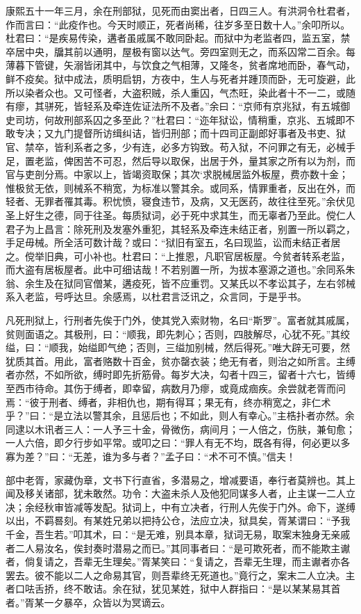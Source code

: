 \documentclass[UTF8,titlepage,oneside]{ctexbook}
\begin{document}
康熙五十一年三月，余在刑部狱，见死而由窦出者，日四三人。有洪洞令杜君者，作而言曰：“此疫作也。今天时顺正，死者尚稀，往岁多至日数十人。”余叩所以。杜君曰：“是疾易传染，遘者虽戚属不敢同卧起。而狱中为老监者四，监五室，禁卒居中央，牖其前以通明，屋极有窗以达气。旁四室则无之，而系囚常二百余。每薄暮下管键，矢溺皆闭其中，与饮食之气相薄，又隆冬，贫者席地而卧，春气动，鲜不疫矣。狱中成法，质明启钥，方夜中，生人与死者并踵顶而卧，无可旋避，此所以染者众也。又可怪者，大盗积贼，杀人重囚，气杰旺，染此者十不一二，或随有瘳，其骈死，皆轻系及牵连佐证法所不及者。”余曰：“京师有京兆狱，有五城御史司坊，何故刑部系囚之多至此？”杜君曰：“迩年狱讼，情稍重，京兆、五城即不敢专决；又九门提督所访缉纠诘，皆归刑部；而十四司正副郎好事者及书吏、狱官、禁卒，皆利系者之多，少有连，必多方钩致。苟入狱，不问罪之有无，必械手足，置老监，俾困苦不可忍，然后导以取保，出居于外，量其家之所有以为剂，而官与吏剖分焉。中家以上，皆竭资取保；其次‘求脱械居监外板屋，费亦数十金；惟极贫无依，则械系不稍宽，为标准以警其余。或同系，情罪重者，反出在外，而轻者、无罪者罹其毒。积忧愤，寝食违节，及病，又无医药，故往往至死。”余伏见圣上好生之德，同于往圣。每质狱词，必于死中求其生，而无辜者乃至此。傥仁人君子为上昌言：除死刑及发塞外重犯，其轻系及牵连未结正者，别置一所以羁之，手足毋械。所全活可数计哉？或曰：“狱旧有室五，名曰现监，讼而未结正者居之。傥举旧典，可小补也。杜君曰：“上推恩，凡职官居板屋。今贫者转系老监，而大盗有居板屋者。此中可细诘哉！不若别置一所，为拔本塞源之道也。”余同系朱翁、余生及在狱同官僧某，遘疫死，皆不应重罚。又某氏以不孝讼其子，左右邻械系入老监，号呼达旦。余感焉，以杜君言泛讯之，众言同，于是乎书。

凡死刑狱上，行刑者先俟于门外，使其党入索财物，名曰“斯罗”。富者就其戚属，贫则面语之。其极刑，曰：“顺我，即先刺心；否则，四肢解尽，心犹不死。”其绞缢，曰：“顺我，始缢即气绝；否则，三缢加别械，然后得死。”唯大辟无可要，然犹质其首。用此，富者赂数十百金，贫亦罄衣装；绝无有者，则治之如所言。主缚者亦然，不如所欲，缚时即先折筋骨。每岁大决，勾者十四三，留者十六七，皆缚至西市待命。其伤于缚者，即幸留，病数月乃瘳，或竟成痼疾。余尝就老胥而问焉：“彼于刑者、缚者，非相仇也，期有得耳；果无有，终亦稍宽之，非仁术乎？”曰：“是立法以警其余，且惩后也；不如此，则人有幸心。”主梏扑者亦然。余同逮以木讯者三人：一人予三十金，骨微伤，病间月；一人倍之，伤肤，兼旬愈；一人六倍，即夕行步如平常。或叩之曰：“罪人有无不均，既各有得，何必更以多寡为差？”曰：“无差，谁为多与者？”孟子曰：“术不可不慎。”信夫！

部中老胥，家藏伪章，文书下行直省，多潜易之，增减要语，奉行者莫辨也。其上闻及移关诸部，犹未敢然。功令：大盗未杀人及他犯同谋多人者，止主谋一二人立决；余经秋审皆减等发配。狱词上，中有立决者，行刑人先俟于门外。命下，遂缚以出，不羁晷刻。有某姓兄弟以把持公仓，法应立决，狱具矣，胥某谓曰：“予我千金，吾生若。”叩其术，曰：“是无难，别具本章，狱词无易，取案末独身无亲戚者二人易汝名，俟封奏时潜易之而已。”其同事者曰：“是可欺死者，而不能欺主谳者，倘复请之，吾辈无生理矣。”胥某笑曰：“复请之，吾辈无生理，而主谳者亦各罢去。彼不能以二人之命易其官，则吾辈终无死道也。”竟行之，案末二人立决。主者口呿舌挢，终不敢诘。余在狱，犹见某姓，狱中人群指曰：“是以某某易其首者。”胥某一夕暴卒，众皆以为冥谪云。
\end{document}
